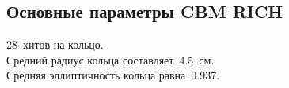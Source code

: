 


\subsection{Основные параметры CBM RICH}

28~хитов на кольцо. \\
Средний радиус кольца составляет~4.5~см. \\
Средняя эллиптичность кольца равна~0.937. \\